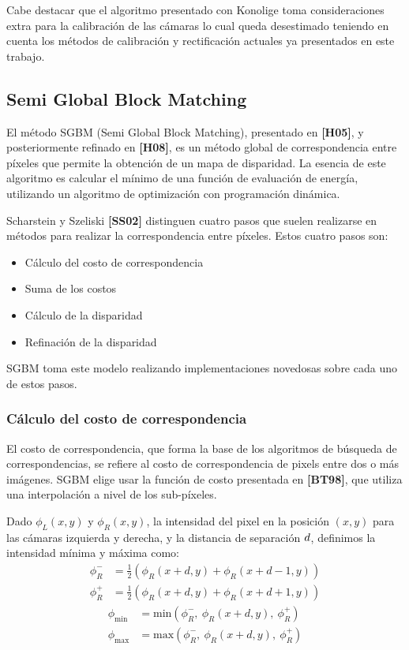 \documentclass[11pt,a4paper,titlepage]{article}
\newcommand{\Cite}[1]{\textbf{[#1]}}
\newcommand{\Scalar}[1]{\ensuremath{\mathnormal{#1}}}
\begin{document}
Cabe destacar que el algoritmo presentado con Konolige toma consideraciones extra para la calibración de las cámaras lo cual queda desestimado teniendo en cuenta los métodos de calibración y rectificación actuales ya presentados en este trabajo.

\subsection{Semi Global Block Matching}

El método SGBM (Semi Global Block Matching), presentado en \Cite{H05}, y posteriormente refinado en \Cite{H08}, es un método global de correspondencia entre píxeles que permite la obtención de un mapa de disparidad. La esencia de este algoritmo es calcular el mínimo de una función de evaluación de energía, utilizando un algoritmo de optimización con programación dinámica.

Scharstein y Szeliski \Cite{SS02} distinguen cuatro pasos que suelen realizarse en métodos para realizar la correspondencia entre píxeles. Estos cuatro pasos son:
\begin{itemize}
	\item Cálculo del costo de correspondencia
	\item Suma de los costos
	\item Cálculo de la disparidad
	\item Refinación de la disparidad
\end{itemize}

SGBM toma este modelo realizando implementaciones novedosas sobre cada uno de estos pasos.

\subsubsection{Cálculo del costo de correspondencia}

El costo de correspondencia, que forma la base de los algoritmos de búsqueda de correspondencias, se refiere al costo de correspondencia de pixels entre dos o más imágenes. SGBM elige usar la función de costo presentada en \Cite{BT98}, que utiliza una interpolación a nivel de los sub-píxeles.

Dado $\phi_L(x, y)$ y $\phi_R(x, y)$, la intensidad del pixel en la posición $(x, y)$ para las cámaras izquierda y derecha, y la distancia de separación \Scalar{d}, definimos la intensidad mínima y máxima como:
\begin{align*}
	\phi_R^- &= \frac{1}{2} \left( \phi_R( x + d, y ) + \phi_R( x + d - 1, y ) \right ) \\
	\phi_R^+ &= \frac{1}{2} \left( \phi_R( x + d, y ) + \phi_R( x + d + 1, y ) \right )
\end{align*}
\begin{align*}
	\phi_\mathrm{min} &= \mathrm{min} \left( \phi_R^-,\ \phi_R( x + d, y ),\ \phi_R^+ \right ) \\
	\phi_\mathrm{max} &= \mathrm{max} \left( \phi_R^-,\ \phi_R( x + d, y ),\ \phi_R^+ \right )
\end{align*}
\end{document}
